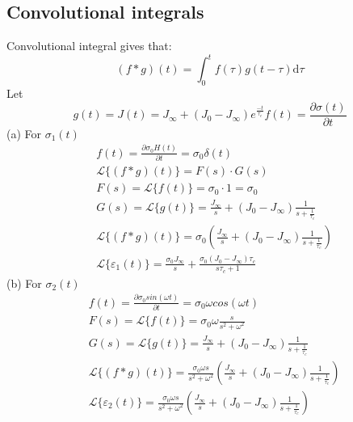 \documentclass{elsarticle}
\begin{document}
\subsection{Convolutional integrals}
Convolutional integral gives that:
\begin{equation*}
    (f*g)(t) = \int_{0}^{t} f(\tau) g(t-\tau)\mathrm{d}\tau
\end{equation*}
Let
\begin{equation*}
g(t) = J(t) = J_\infty+(J_0-J_\infty)e^{\frac{-t}{\tau_c}}
f(t)=\frac{\partial\sigma(t)}{\partial t}
\end{equation*}
(a) For $\sigma_1(t)
$ \begin{align*}
&f(t)=\frac{\partial\sigma_0H(t)}{\partial t}=\sigma_0\delta(t)\\
&\mathcal{L}\{(f*g)(t)\}=F(s)\cdot G(s)\\
&F(s)=\mathcal{L}\{f(t)\}=\sigma_0\cdot1=\sigma_0\\
&G(s)=\mathcal{L}\{g(t)\}=\frac{J_\infty}{s}+(J_0-J_\infty)\frac{1}{s+\frac{1}{\tau_c}}\\
&\mathcal{L}\{(f*g)(t)\}=\sigma_0(\frac{J_\infty}{s}+(J_0-J_\infty)\frac{1}{s+\frac{1}{\tau_c}})\\
&\mathcal{L}\{\varepsilon_1 (t)\}=\frac{\sigma_0 J_\infty}{s}+\frac{\sigma_0(J_0-J_\infty)\tau_c}{s\tau_c+1}
\end{align*}
(b) For $\sigma_2(t)$
\begin{align*}
&f(t)=\frac{\partial\sigma_0 sin(\omega t)}{\partial t}=\sigma_0\omega cos(\omega t)\\
&F(s)=\mathcal{L}\{f(t)\}=\sigma_0\omega\frac{s}{s^2+\omega^2}\\
&G(s)=\mathcal{L}\{g(t)\}=\frac{J_\infty}{s}+(J_0-J_\infty)\frac{1}{s+\frac{1}{\tau_c}}\\
&\mathcal{L}\{(f*g)(t)\}=\frac{\sigma_0\omega s}{s^2+\omega^2}(\frac{J_\infty}{s}+(J_0-J_\infty)\frac{1}{s+\frac{1}{\tau_c}})\\
&\mathcal{L}\{\varepsilon_2 (t)\}=\frac{\sigma_0\omega s}{s^2+\omega^2}(\frac{J_\infty}{s}+(J_0-J_\infty)\frac{1}{s+\frac{1}{\tau_c}})\\
\end{align*}
\newpage
\end{document}
